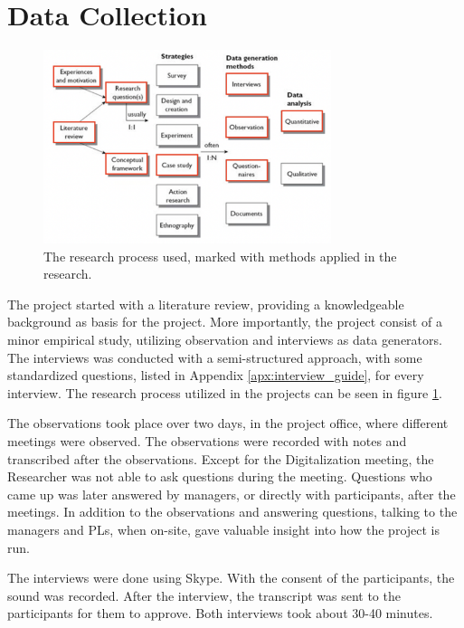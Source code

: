 \section{Data Collection}
\begin{figure}
    \begin{center}
        \includegraphics[width=0.75\textwidth]{fig/empirisk_studie.png}
        \caption{The research process used, marked with methods applied in the research.}
        \label{fig:research_process}
    \end{center}
\end{figure}

The project started with a literature review, providing a knowledgeable background as basis for the project. More importantly, the project consist of a minor empirical study, utilizing observation and interviews as data generators. The interviews was conducted with a semi-structured approach, with some standardized questions, listed in Appendix \ref{apx:interview_guide}, for every interview. The research process utilized in the projects can be seen in figure \ref{fig:research_process}.

The observations took place over two days, in the project office, where different meetings were observed. The observations were recorded with notes and transcribed after the observations. Except for the Digitalization meeting, the Researcher was not able to ask questions during the meeting.  Questions who came up was later answered by managers, or directly with participants, after the meetings. In addition to the observations and answering questions, talking to the managers and PLs, when on-site, gave valuable insight into how the project is run.

The interviews were done using Skype. With the consent of the participants, the sound was recorded. After the interview, the transcript was sent to the participants for them to approve. Both interviews took about 30-40 minutes. 

